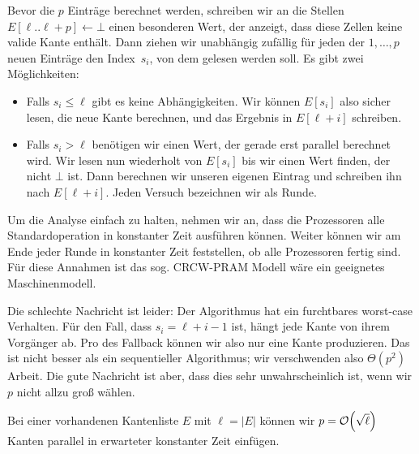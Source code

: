 Bevor die $p$ Einträge berechnet werden, schreiben wir an die Stellen $E[\ell..\ell+p] \gets \bot$ einen besonderen Wert, der anzeigt, dass diese Zellen keine valide Kante enthält.
Dann ziehen wir unabhängig zufällig für jeden der $1, \ldots, p$ neuen Einträge den Index~$s_i$, von dem gelesen werden soll.
Es gibt zwei Möglichkeiten:
\begin{itemize}
    \item Falls $s_i \le \ell$ gibt es keine Abhängigkeiten.
          Wir können $E[s_i]$ also sicher lesen, die neue Kante berechnen, und das Ergebnis in $E[\ell + i]$ schreiben.
    \item Falls $s_i > \ell$ benötigen wir einen Wert, der gerade erst parallel berechnet wird.
          Wir lesen nun wiederholt von $E[s_i]$ bis wir einen Wert finden, der nicht $\bot$ ist.
          Dann berechnen wir unseren eigenen Eintrag und schreiben ihn nach $E[\ell +i]$.
          Jeden Versuch bezeichnen wir als Runde.
\end{itemize}

Um die Analyse einfach zu halten, nehmen wir an, dass die Prozessoren alle Standardoperation in konstanter Zeit ausführen können.
Weiter können wir am Ende jeder Runde in konstanter Zeit feststellen, ob alle Prozessoren fertig sind.
Für diese Annahmen ist das sog. CRCW-PRAM Modell wäre ein geeignetes Maschinenmodell.

Die schlechte Nachricht ist leider:
Der Algorithmus hat ein furchtbares worst-case Verhalten.
Für den Fall, dass $s_i = \ell + i - 1$ ist, hängt jede Kante von ihrem Vorgänger ab.
Pro  des Fallback können wir also nur eine Kante produzieren.
Das ist nicht besser als ein sequentieller Algorithmus; wir verschwenden also $\Theta(p^2)$ Arbeit.
Die gute Nachricht ist aber, dass dies sehr unwahrscheinlich ist, wenn wir $p$ nicht allzu groß wählen.

\begin{lemma}\label{lem:par_ba_einzelschritt}
    Bei  einer vorhandenen Kantenliste $E$ mit $\ell = |E|$ können wir $p = \mathcal{O}\!\left(\sqrt{\ell}\right)$ Kanten parallel in erwarteter konstanter Zeit einfügen.
\end{lemma}

